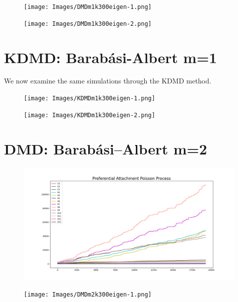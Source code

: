 \begin{figure}
    \texttt{[image: Images/DMDm1k300eigen-1.png]}
    \centering
\end{figure}

\begin{figure}
    \texttt{[image: Images/DMDm1k300eigen-2.png]}
    \centering
\end{figure}

\clearpage

\section{KDMD: Barabási-Albert m=1}

We now examine the same simulations through the KDMD method.

\FloatBarrier

\begin{figure}
    \texttt{[image: Images/KDMDm1k300eigen-1.png]}
    \centering
\end{figure}

\begin{figure}
    \texttt{[image: Images/KDMDm1k300eigen-2.png]}
    \centering
\end{figure}

\clearpage

\FloatBarrier

\section{DMD: Barabási–Albert m=2}

\begin{figure}
    \includegraphics[width=12cm]{Images/poissonprocess_pref_attach_2.png}
    \centering
\end{figure}

\begin{figure}
    \texttt{[image: Images/DMDm2k300eigen-1.png]}
    \centering
\end{figure}

